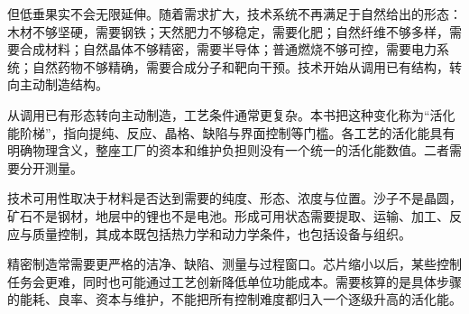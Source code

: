 但低垂果实不会无限延伸。随着需求扩大，技术系统不再满足于自然给出的形态：木材不够坚硬，需要钢铁；天然肥力不够稳定，需要化肥；自然纤维不够多样，需要合成材料；自然晶体不够精密，需要半导体；普通燃烧不够可控，需要电力系统；自然药物不够精确，需要合成分子和靶向干预。技术开始从调用已有结构，转向主动制造结构。


从调用已有形态转向主动制造，工艺条件通常更复杂。本书把这种变化称为“活化能阶梯”，指向提纯、反应、晶格、缺陷与界面控制等门槛。各工艺的活化能具有明确物理含义，整座工厂的资本和维护负担则没有一个统一的活化能数值。二者需要分开测量。

技术可用性取决于材料是否达到需要的纯度、形态、浓度与位置。沙子不是晶圆，矿石不是钢材，地层中的锂也不是电池。形成可用状态需要提取、运输、加工、反应与质量控制，其成本既包括热力学和动力学条件，也包括设备与组织。

精密制造常需要更严格的洁净、缺陷、测量与过程窗口。芯片缩小以后，某些控制任务会更难，同时也可能通过工艺创新降低单位功能成本。需要核算的是具体步骤的能耗、良率、资本与维护，不能把所有控制难度都归入一个逐级升高的活化能。

